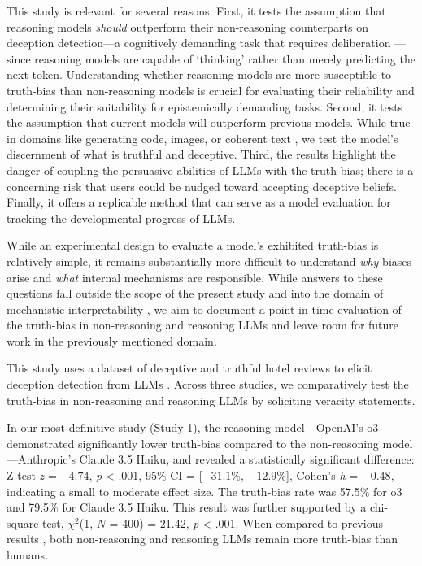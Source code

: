 \documentclass{article}
\begin{document}
This study is relevant for several reasons. First, it tests the assumption that reasoning models \textit{should} outperform their non-reasoning counterparts on deception detection---a cognitively demanding task that requires deliberation \citep{mccornack_deception_1986}---since reasoning models are capable of `thinking' rather than merely predicting the next token. Understanding whether reasoning models are more susceptible to truth-bias than non-reasoning models is crucial for evaluating their reliability and determining their suitability for epistemically demanding tasks. Second, it tests the assumption that current models will outperform previous models. While true in domains like generating code, images, or coherent text \citep{handa2025economictasksperformedai, anthropic_anthropic_2025}, we test the model's discernment of what is truthful and deceptive. Third, the results highlight the danger of coupling the persuasive abilities of LLMs with the truth-bias; there is a concerning risk that users could be nudged toward accepting deceptive beliefs. Finally, it offers a replicable method that can serve as a model evaluation for tracking the developmental progress of LLMs.

While an experimental design to evaluate a model's exhibited truth-bias is relatively simple, it remains substantially more difficult to understand \textit{why} biases arise and \textit{what} internal mechanisms are responsible. While answers to these questions fall outside the scope of the present study and into the domain of mechanistic interpretability \citep{Nanda2023ProgressMF}, we aim to document a point-in-time evaluation of the truth-bias in non-reasoning and reasoning LLMs and leave room for future work in the previously mentioned domain.

This study uses a dataset of deceptive and truthful hotel reviews \citep{ott_finding_2011} to elicit deception detection from LLMs \citep{markowitz_generative_2024}. Across three studies, we comparatively test the truth-bias in non-reasoning and reasoning LLMs by soliciting veracity statements.

In our most definitive study (Study 1), the reasoning model---OpenAI's o3---demonstrated significantly lower truth-bias compared to the non-reasoning model---Anthropic's Claude 3.5 Haiku, and revealed a statistically significant difference: Z-test $z = -4.74$, \textit{p} < .001, 95\% CI = [$-31.1\%$, $-12.9\%$], Cohen’s \textit{h} = $-0.48$, indicating a small to moderate effect size. The truth-bias rate was 57.5\% for o3 and 79.5\% for Claude 3.5 Haiku. This result was further supported by a chi-square test, $\chi^2$(1, $N$ = 400) = 21.42, \textit{p} < .001. When compared to previous results \citep{markowitz_generative_2024}, both non-reasoning and reasoning LLMs remain more truth-bias than humans.
\end{document}
